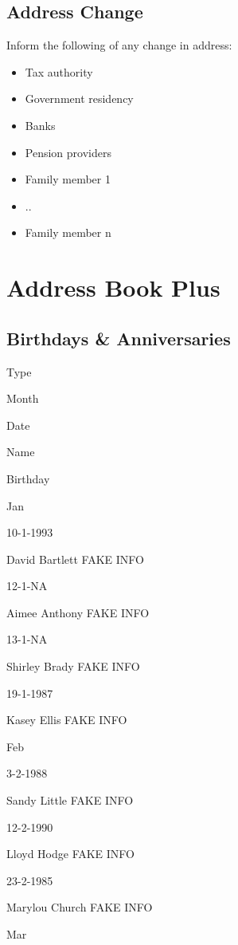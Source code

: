 \documentclass[]{book}
\providecommand{\tightlist}{%
  \setlength{\itemsep}{0pt}\setlength{\parskip}{0pt}}
\theoremstyle{definition}
\theoremstyle{definition}
\theoremstyle{definition}
\theoremstyle{remark}
\begin{document}
\section{Address Change}\label{address-change}

Inform the following of any change in address:

\begin{itemize}
\tightlist
\item
  Tax authority
\item
  Government residency
\item
  Banks
\item
  Pension providers
\item
  Family member 1
\item
  ..
\item
  Family member n
\end{itemize}

\chapter{Address Book Plus}\label{address-book-plus}

\section{Birthdays \& Anniversaries}\label{birthdays-anniversaries}

Type

Month

Date

Name

Birthday

Jan

10-1-1993

David Bartlett FAKE INFO

12-1-NA

Aimee Anthony FAKE INFO

13-1-NA

Shirley Brady FAKE INFO

19-1-1987

Kasey Ellis FAKE INFO

Feb

3-2-1988

Sandy Little FAKE INFO

12-2-1990

Lloyd Hodge FAKE INFO

23-2-1985

Marylou Church FAKE INFO

Mar
\end{document}
